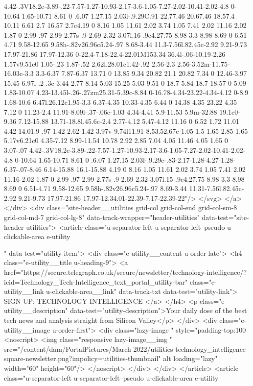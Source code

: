 {{{4.42-.3V18.2c-3.89-.22-7.57-1.27-10.93-2.17-3.6-1.05-7.27-2.02-10.41-2.02-4.8 0-10.64 1.65-10.71 8.61 0 .6.07 1.27.15 2.03l-.9.29C.91 22.77.46 20.67.46 18.57.4 10.11 6.61 2.7 16.57 2.7c4.19 0 8.16 1.05 11.61 2.02 3.74 1.05 7.41 2.02 11.16 2.02 1.87 0 2.99-.97 2.99-2.77s-.9-2.69-2.32-3.07l.16-.9c4.27.75 8.98 3.3 8.98 8.69 0 6.51-4.71 9.58-12.65 9.58h-.82v26.96c5.24-.97 8.68-3.44 11.3-7.56l.82.45c-2.92 9.21-9.73 17.97-21.86 17.97-12.36 0-22.4-7.18-22.4-22.01M153.34 36.4l-.06-10.19-2.26 1.57v9.51c0 1.05-.23 1.87-.52 2.62l.28.01c1.42-.92 2.56-2.3 2.56-3.52m-11.75-16.03c-3.3 3.3-6.37 7.87-6.37 13.71 0 13.85 9.34 20.82 21.1 20.82 7.34 0 12.46-3.97 15.45-6.97l-.2-.3c-3.44 2.77-8.14 5.03-15.25 5.03-9.51 0-18.7-5.84-18.7-18.57 0-5.09 1.83-10.07 4.23-13.45l-.26-.27zm25.31-5.39c-8.84 0-16.78-4.34-23.22-4.34-4.12 0-8.9 1.68-10.6 6.47l.26.12c1.95-3.3 6.37-4.35 10.33-4.35 6.44 0 14.38 4.35 23.22 4.35 7.12 0 11.23-2.4 11.91-8.09l-.37-.06c-1.03 4.34-4.41 5.9-11.53 5.9m-32.88 19.1c0-9.36 7.12-15.88 13.71-18.8l.45.6c-2.4 2.77-4.12 5.47-4.12 11.16 0 6.52 1.72 11.01 4.42 14.01.9-.97 1.42-2.62 1.42-3.97v-9.74l11.91-8.53.52.67c-1.05 1.5-1.65 2.85-1.65 5.17v6.21c0 4.35-7.12 8.99-11.54 10.78 2.92 2.85 7.04 4.05 11.46 4.05 1.65 0 3.07-.07 4.42-.3V18.2c-3.89-.22-7.57-1.27-10.93-2.17-3.6-1.05-7.27-2.02-10.41-2.02-4.8 0-10.64 1.65-10.71 8.61 0 .6.07 1.27.15 2.03l-.9.29c-.83-2.17-1.28-4.27-1.28-6.37-.07-8.46 6.14-15.88 16.1-15.88 4.19 0 8.16 1.05 11.61 2.02 3.74 1.05 7.41 2.02 11.16 2.02 1.87 0 2.99-.97 2.99-2.77s-.9-2.69-2.32-3.07l.15-.9c4.27.75 8.98 3.3 8.98 8.69 0 6.51-4.71 9.58-12.65 9.58h-.82v26.96c5.24-.97 8.69-3.44 11.31-7.56l.82.45c-2.92 9.21-9.73 17.97-21.86 17.97-12.34.01-22.39-7.17-22.39-22"/>
</svg>
</a>
</div>
<div class="site-header__utilities grid-col grid-col-end grid-col-sm-8 grid-col-md-7 grid-col-lg-8" data-track-wrapper="header-utilities" data-test="site-header-utilities">
<article class="u-separator-left
			u-separator-left--pseudo
			u-clickable-area
			e-utility
			
			" data-test="utility-item">
<div class="e-utility__content u-order-late">
<h4 class="e-utility__title u-heading-9">
<a href="https://secure.telegraph.co.uk/secure/newsletter/technology-intelligence/?icid=Technology_Tech-Intelligence_text_portal_utility-bar" class="e-utility__link u-clickable-area__link" data-track-txt data-test="utility-link">
SIGN UP: TECHNOLOGY INTELLIGENCE
</a>
</h4>
<p class="e-utility__description" data-test="utility-description">Your daily dose of the best tech news and analysis straight from Silicon Valley</p>
</div>
<div class="e-utility__image u-order-first">
<div class="lazy-image   " style="padding-top:100%
<noscript>
<img class="responsive lazy-image__img " src="/content/dam/PortalPictures/March-2022/utilities-technology_intelligence-square-newsletter.png?impolicy=utilities-thumbnail" alt loading="lazy" width="60" height="60"/>
</noscript>
</div>
</div>
</article>
<article class="u-separator-left
			u-separator-left--pseudo
			u-clickable-area
			e-utility
			
}}}
